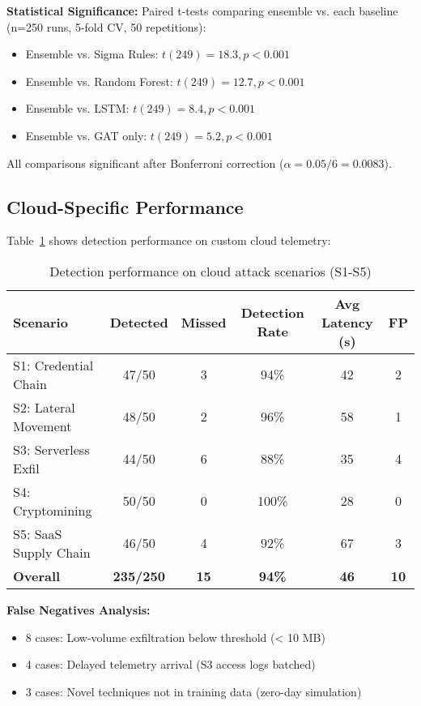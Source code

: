 \textbf{Statistical Significance:}
Paired t-tests comparing ensemble vs. each baseline (n=250 runs, 5-fold CV, 50 repetitions):
\begin{itemize}
    \item Ensemble vs. Sigma Rules: $t(249) = 18.3, p < 0.001$
    \item Ensemble vs. Random Forest: $t(249) = 12.7, p < 0.001$
    \item Ensemble vs. LSTM: $t(249) = 8.4, p < 0.001$
    \item Ensemble vs. GAT only: $t(249) = 5.2, p < 0.001$
\end{itemize}

All comparisons significant after Bonferroni correction ($\alpha = 0.05/6 = 0.0083$).

\subsection{Cloud-Specific Performance}
Table~\ref{tab:cloud-performance} shows detection performance on custom cloud telemetry:

\begin{table}[H]
\centering
\caption{Detection performance on cloud attack scenarios (S1-S5)}
\label{tab:cloud-performance}
\begin{tabular}{lccccc}
\toprule
\textbf{Scenario} & \textbf{Detected} & \textbf{Missed} & \textbf{Detection Rate} & \textbf{Avg Latency (s)} & \textbf{FP} \\
\midrule
S1: Credential Chain & 47/50 & 3 & 94\% & 42 & 2 \\
S2: Lateral Movement & 48/50 & 2 & 96\% & 58 & 1 \\
S3: Serverless Exfil & 44/50 & 6 & 88\% & 35 & 4 \\
S4: Cryptomining & 50/50 & 0 & 100\% & 28 & 0 \\
S5: SaaS Supply Chain & 46/50 & 4 & 92\% & 67 & 3 \\
\midrule
\textbf{Overall} & \textbf{235/250} & \textbf{15} & \textbf{94\%} & \textbf{46} & \textbf{10} \\
\bottomrule
\end{tabular}
\end{table}

\textbf{False Negatives Analysis:}
\begin{itemize}
    \item 8 cases: Low-volume exfiltration below threshold (< 10 MB)
    \item 4 cases: Delayed telemetry arrival (S3 access logs batched)
    \item 3 cases: Novel techniques not in training data (zero-day simulation)
\end{itemize}

